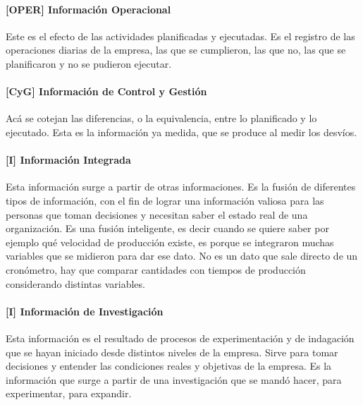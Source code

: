 \hypertarget{informacion-operacional}{%
\paragraph{[OPER] Información Operacional}\label{informacion-operacional}}
Este es el efecto de las actividades planificadas y ejecutadas. Es el
registro de las operaciones diarias de la empresa, las que se
cumplieron, las que no, las que se planificaron y no se pudieron
ejecutar.

\hypertarget{informaciuxf3n-de-control-y-gestiuxf3n}{%
\paragraph{[CyG] Información de Control y
Gestión}\label{informaciuxf3n-de-control-y-gestiuxf3n}}
Acá se cotejan las diferencias, o la equivalencia, entre lo planificado
y lo ejecutado. Esta es la información ya medida, que se produce al
medir los desvíos.

\hypertarget{informaciuxf3n-integrada}{%
\paragraph{[I] Información Integrada}\label{informaciuxf3n-integrada}}
Esta información surge a partir de otras informaciones. Es la fusión de
diferentes tipos de información, con el fin de lograr una información
valiosa para las personas que toman decisiones y necesitan saber el
estado real de una organización. Es una fusión inteligente, es decir
cuando se quiere saber por ejemplo qué velocidad de producción existe,
es porque se integraron muchas variables que se midieron para dar ese
dato. No es un dato que sale directo de un cronómetro, hay que comparar
cantidades con tiempos de producción considerando distintas variables.

\hypertarget{informaciuxf3n-de-investigaciuxf3n}{%
\paragraph{[I] Información de
Investigación}\label{informaciuxf3n-de-investigaciuxf3n}}
Esta información es el resultado de procesos de experimentación y de
indagación que se hayan iniciado desde distintos niveles de la empresa.
Sirve para tomar decisiones y entender las condiciones reales y
objetivas de la empresa. Es la información que surge a partir de una
investigación que se mandó hacer, para experimentar, para expandir.

\onecolumn
